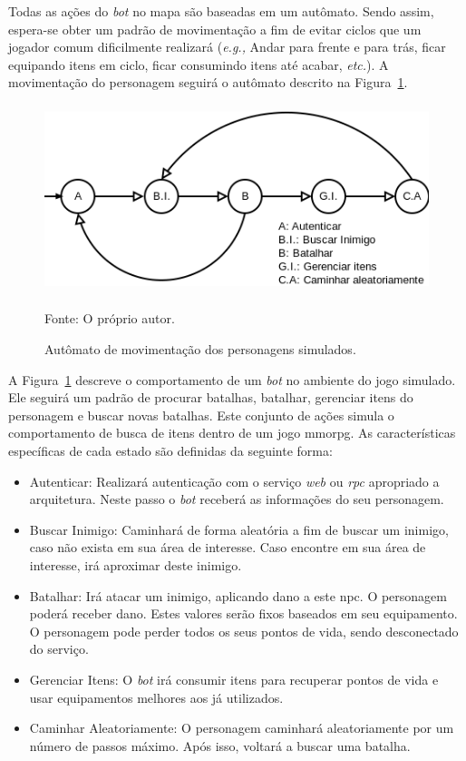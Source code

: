 Todas as ações do \textit{bot} no mapa são baseadas em um autômato.
%
Sendo assim, espera-se obter um padrão de movimentação a fim de evitar ciclos que um jogador comum dificilmente realizará (\textit{e.g.,} Andar para frente e para trás, ficar equipando itens em ciclo, ficar consumindo itens até acabar, \textit{etc.}).
%
A movimentação do personagem seguirá o autômato descrito na Figura~\ref{fig:movimentacao}.


\begin{figure}[htb!]
  \caption{Autômato de movimentação dos personagens simulados.}
  \label{fig:movimentacao}
  \includegraphics[height=5.5cm]{img/cap3/movimentacao.png}
  \centering

  Fonte: O próprio autor.
\end{figure}

A Figura~\ref{fig:movimentacao} descreve o comportamento de um \textit{bot} no ambiente do jogo simulado.
%
Ele seguirá um padrão de procurar batalhas, batalhar, gerenciar itens do personagem e buscar novas batalhas.
%
Este conjunto de ações simula o comportamento de busca de itens dentro de um jogo \ac{mmorpg}.
%
As características específicas de cada estado são definidas da seguinte forma:

\begin{itemize}
  \item Autenticar: Realizará autenticação com o serviço \textit{web} ou \textit{rpc} apropriado a arquitetura. Neste passo o \textit{bot} receberá as informações do seu personagem.
  \item Buscar Inimigo: Caminhará de forma aleatória a fim de buscar um inimigo, caso não exista em sua área de interesse. Caso encontre em sua área de interesse, irá aproximar deste inimigo.
  \item Batalhar: Irá atacar um inimigo, aplicando dano a este \ac{npc}. O personagem poderá receber dano. Estes valores serão fixos baseados em seu equipamento. O personagem pode perder todos os seus pontos de vida, sendo desconectado do serviço.
  \item Gerenciar Itens: O \textit{bot} irá consumir itens para recuperar pontos de vida e usar equipamentos melhores aos já utilizados.
  \item Caminhar Aleatoriamente: O personagem caminhará aleatoriamente por um número de passos máximo. Após isso, voltará a buscar uma batalha.
\end{itemize}


